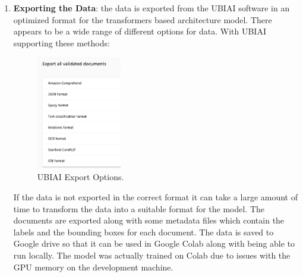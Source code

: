 \begin{enumerate}
	\item \textbf{Exporting the Data}: the data is exported from the UBIAI software in an optimized format for the transformers
	      based architecture model. There appears to be a wide range of different options for data. With UBIAI supporting these methods:
	      \begin{figure}[H]
		      \centering
		      \includegraphics[width=0.35\textwidth]{figures/ubiai_export_options.png}
		      \caption{UBIAI Export Options.}
		      \label{fig:ubiai_export_options}
	      \end{figure}
	      If the data is not exported in the correct format it can take a large amount of time to transform the data into a
	      suitable format for the model.
	      The documents are exported along with some metadata files which contain the labels and the bounding boxes for each
	      document.
	      \bigbreak
	      The data is saved to Google drive so that it can be used in Google Colab along with being able to run locally. The model
	      was actually trained on Colab due to issues with the GPU memory on the development machine.
\end{enumerate}
